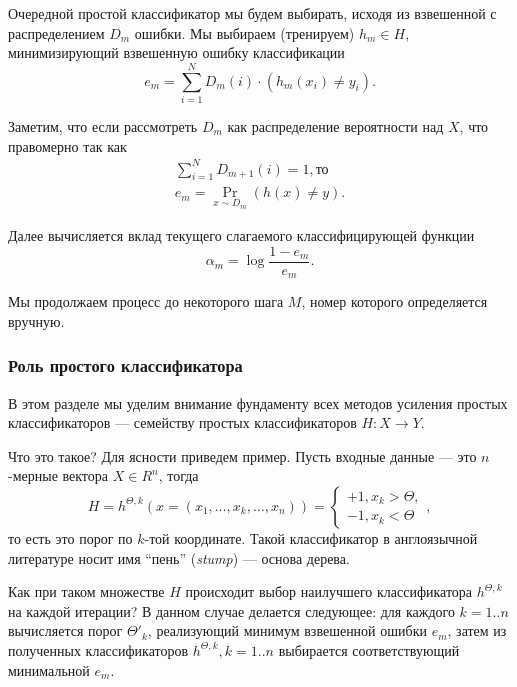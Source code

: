 Очередной простой классификатор мы будем выбирать, исходя из взвешенной с распределением $D_m$ ошибки. Мы выбираем (тренируем) $h_m \in H$, минимизирующий взвешенную ошибку классификации
\begin{displaymath}
  e_m = \sum_{i = 1}^N{D_m(i) \cdot (h_m(x_i) \neq y_i)}.
\end{displaymath}

Заметим, что если рассмотреть $D_m$ как распределение вероятности над $X$, что правомерно так как
\begin{gather*}
  \sum_{i = 1}^N{D_{m + 1}(i)} = 1, \text{то}\\
  e_m = \underset{x \sim D_m}{\Pr}(h(x) \neq y).
\end{gather*}

Далее вычисляется вклад текущего слагаемого классифицирующей функции
\begin{displaymath}
  \alpha_m = \log{\frac{1 - e_m}{e_m}}.
\end{displaymath}

Мы продолжаем процесс до некоторого шага $M$, номер которого определяется вручную.

\subsubsection{Роль простого классификатора}
В этом разделе мы уделим внимание фундаменту всех методов усиления простых классификаторов --- семейству простых классификаторов $H : X \to Y$.

Что это такое? Для ясности приведем пример. Пусть входные данные --- это $n$-мерные вектора $X \in R^n$, тогда
\begin{displaymath}
  H = h^{\Theta, k}(x = (x_1, \dots, x_k, \dots, x_n)) = \begin{cases}+1, x_k > \Theta,\\ -1, x_k < \Theta\end{cases},
\end{displaymath}
то есть это порог по $k$-той координате. Такой классификатор в англоязычной литературе носит имя ``пень'' (\emph{stump}) --- основа дерева.

Как при таком множестве $H$ происходит выбор наилучшего классификатора $h^{\Theta, k}$ на каждой итерации? В данном случае делается следующее: для каждого $k = 1..n$ вычисляется порог $\Theta'_k$, реализующий минимум взвешенной ошибки $e_m$, затем из полученных классификаторов $h^{\Theta, k}, k = 1..n$ выбирается соответствующий минимальной $e_m$.

